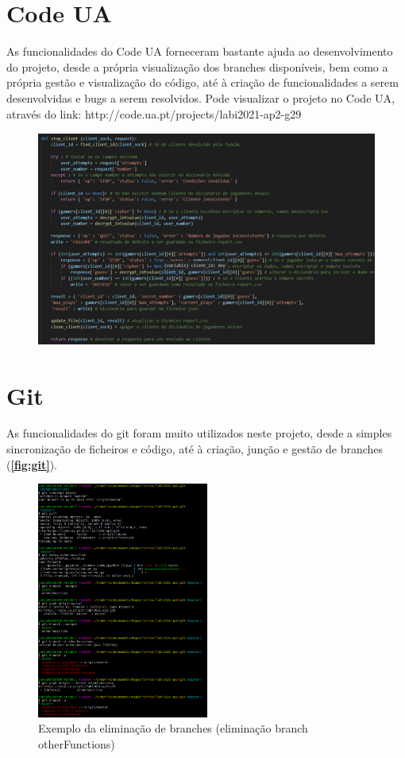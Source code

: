 \documentclass{report}
\begin{document}
\section{Code UA}
\label{sec:git}
As funcionalidades do Code UA forneceram bastante ajuda ao desenvolvimento do projeto, desde a própria visualização dos branches disponíveis, bem como a própria gestão e visualização do código, até à criação de funcionalidades a serem desenvolvidas e bugs a serem resolvidos. Pode visualizar o projeto no Code UA, através do link: http://code.ua.pt/projects/labi2021-ap2-g29
\cite{codeua}



\begin{figure}[!h]
\center
\includegraphics[height = 200pt]{img/stopclient.png}
\end{figure}

\section{Git}
\label{sec:git}
As funcionalidades do git foram muito utilizados neste projeto, desde a simples sincronização de ficheiros e código, até à criação, junção e gestão de branches (\textbf{\autoref{fig:git}}). 

\begin{figure}[!h]
\center 
\includegraphics[height=220pt]{img/otherFunctions_Branch_deletion.png}
\caption{Exemplo da eliminação de branches (eliminação branch otherFunctions)}
\label{fig:git}
\end{figure}
\end{document}
